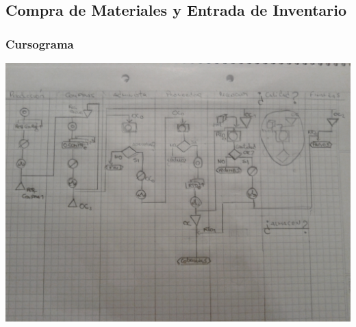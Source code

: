 \subsection{Compra de Materiales y Entrada de Inventario} 

\subsubsection{Cursograma}
\includegraphics [angle=90,width=\linewidth]{Empresa/Circuitos/Compras/Compras.jpg}

\pagebreak

